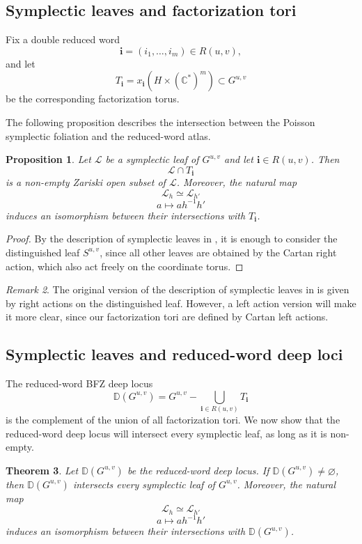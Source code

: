 \documentclass[12pt]{amsart}
\newcommand{\D}{\mathbb D}
\theoremstyle{plain}
\newtheorem{theorem}{Theorem}[section]
\newtheorem{proposition}[theorem]{Proposition}
\theoremstyle{definition}
\theoremstyle{remark}
\newtheorem{remark}[theorem]{Remark}
\begin{document}
\subsection{Symplectic leaves and factorization tori}

Fix a double reduced word
\[
\mathbf i=(i_1,\ldots,i_m)\in R(u,v),
\]
and let
\[
T_{\mathbf i}
=
x_{\mathbf i}
(H\times(\mathbb C^*)^m)
\subset G^{u,v}
\]
be the corresponding factorization torus.

The following proposition describes the intersection between the Poisson symplectic foliation and the reduced-word atlas.

\begin{proposition}
\label{prop:leaf_factorization}
Let $\mathcal L$ be a symplectic leaf of $G^{u,v}$ and let
$\mathbf i\in R(u,v)$. Then
\[
\mathcal L\cap T_{\mathbf i}
\]
is a non-empty Zariski open subset of $\mathcal L$. Moreover, the natural map
\[\mathcal L_h\simeq \mathcal L_{h'}\]
\[a\mapsto ah^{-1}h'\]
induces an isomorphism between their intersections with $T_{\mathbf i}$.
\end{proposition}

\begin{proof}
By the description of symplectic leaves in \cite{KZ02}, it is enough to consider the
distinguished leaf $S^{u,v}$, since all other leaves are obtained by
the Cartan right action, which also act freely on the coordinate torus.
\end{proof}

\begin{remark}
   The original version of the description of symplectic leaves in \cite{KZ02} is given by right actions on the distinguished leaf. However, a left action version will make it more clear, since our factorization tori are defined by Cartan left actions.
\end{remark}


\subsection{Symplectic leaves and reduced-word deep loci}

The reduced-word BFZ deep locus
\[
\mathbb D(G^{u,v})=G^{u,v}-\bigcup_{\mathbf i\in R(u,v)}T_{\mathbf i}
\]
is the complement of the union of all factorization tori. We now show that the reduced-word deep locus will intersect every symplectic leaf, as long as it is non-empty. 

\begin{theorem}
\label{thm:deep_intersects_leaves}
Let $\D(G^{u,v})$ be the reduced-word deep locus. If $\D(G^{u,v})\neq\varnothing$, then $\D(G^{u,v})$ intersects every symplectic leaf of $G^{u,v}$.  Moreover, the natural map
\[\mathcal L_h\simeq \mathcal L_{h'}\]
\[a\mapsto ah^{-1}h'\]
induces an isomorphism between their intersections with $\D(G^{u,v})$.
\end{theorem}
\end{document}
